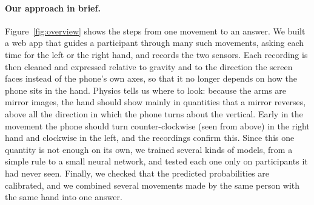 \paragraph{Our approach in brief.} Figure~\ref{fig:overview} shows the steps from one movement to an answer. We built
a web app that guides a participant through many such movements, asking each time for the left or the right hand,
and records the two sensors. Each recording is then cleaned and expressed relative to gravity and to the direction
the screen faces instead of the phone's own axes, so that it no longer depends on how the phone sits in the hand.
Physics tells us where to look: because the arms are mirror images, the hand should show mainly in quantities that a
mirror reverses, above all the direction in which the phone turns about the vertical. Early in the movement the phone
should turn counter-clockwise (seen from above) in the right hand and clockwise in the left, and the recordings
confirm this. Since this one quantity is not enough on its own, we trained several kinds of models, from a simple
rule to a small neural network, and tested each one only on participants it had never seen. Finally, we checked that
the predicted probabilities are calibrated, and we combined several movements made by the same person with the same
hand into one answer.

